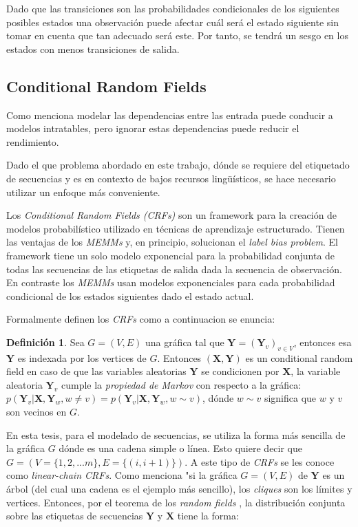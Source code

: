 \documentclass[letterpaper,12pt,oneside]{book}
\theoremstyle{definition}
\newtheorem{definition}{Definición}
\begin{document}
Dado que las transiciones son las probabilidades condicionales de los siguientes posibles estados una observación puede afectar cuál será el estado siguiente sin tomar en cuenta que tan adecuado será este. Por tanto, se tendrá un sesgo en los estados con menos transiciones de salida.

\subsection{Conditional Random Fields}

Como menciona \citet{sutton2012introduction} modelar las dependencias entre las entrada puede conducir a modelos intratables, pero ignorar estas dependencias puede reducir el rendimiento.

Dado el que problema abordado en este trabajo, dónde se requiere del etiquetado de secuencias y es en contexto de bajos recursos lingüísticos, se hace necesario utilizar un enfoque más conveniente.

Los \textit{Conditional Random Fields (CRFs)} son un framework para la creación de modelos probabilístico utilizado en técnicas de aprendizaje estructurado. Tienen las ventajas de los \textit{MEMMs} y, en principio, solucionan el \emph{label bias problem}. El framework tiene un solo modelo exponencial para la probabilidad conjunta de todas las secuencias de las etiquetas de salida dada la secuencia de observación. En contraste los \emph{MEMMs} usan modelos exponenciales para cada probabilidad condicional de los estados siguientes dado el estado actual.

Formalmente \citet{lafferty2001conditional} definen los \textit{CRFs} como a continuacion se enuncia:

\begin{definition}
	Sea $G = (V,E)$ una gráfica tal que $\mathbf{Y} = (\mathbf{Y}_{v})_{v \in V}$, entonces esa $\mathbf{Y}$ es indexada por los vertices de $G$. Entonces $(\mathbf{X}, \mathbf{Y})$ es un \textsf{conditional random field} en caso de que las variables aleatorias $\mathbf{Y}$ se condicionen por $\mathbf{X}$, la variable aleatoria $\mathbf{Y}_{v}$ cumple la \textit{propiedad de Markov} con respecto a la gráfica: $p(\mathbf{Y}_{v}|\mathbf{X},\mathbf{Y}_{w},w \ne v) = p(\mathbf{Y}_{v}|\mathbf{X},\mathbf{Y}_{w},w \sim v)$, dónde $w \sim v$ significa que $w$ y $v$ son vecinos en $G$.
\end{definition}

En esta tesis, para el modelado de secuencias, se utiliza la forma más sencilla de la gráfica $G$ dónde es una cadena simple o línea. Esto quiere decir que $G = (V = \{1,2,...m\}, E = \{(i,i+1)\})$. A este tipo de \textit{CRFs} se les conoce como \textit{linear-chain CRFs}. Como menciona \citet{lafferty2001conditional} "si la gráfica $G = (V,E)$ de $\mathbf{Y}$ es un árbol (del cual una cadena es el ejemplo más sencillo), los \textit{cliques} son los límites y vertices. Entonces, por el teorema de los \textit{random fields} \citep{hammersley1971markov}, la distribución conjunta sobre las etiquetas de secuencias $\mathbf{Y}$ y $\mathbf{X}$ tiene la forma:
\end{document}
